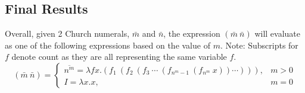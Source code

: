 \documentclass[letterpaper, 10pt, DIV=13]{scrartcl}
\numberwithin{equation}{section}
\numberwithin{figure}{section}
\numberwithin{table}{section}
\begin{document}
\subsection{Final Results}
Overall, given 2 Church numerals, $\bar{m}$ and $\bar{n}$, the expression $(\bar{m}~\bar{n})$ will evaluate as one of the following expressions
based on the value of $m$. Note: Subscripts for $f$ denote count as they are all representing the same variable $f$.
\begin{equation*}
    (\bar{m}~\bar{n}) =
    \begin{cases}
        \overline{n^m} = \lambda fx.(f_1~(f_2~(f_3~\cdots~(f_{n^m - 1}~(f_{n^m}~x))\cdots))), & m > 0 \\
        I = \lambda x.x, & m = 0
    \end{cases}
\end{equation*}
\end{document}
